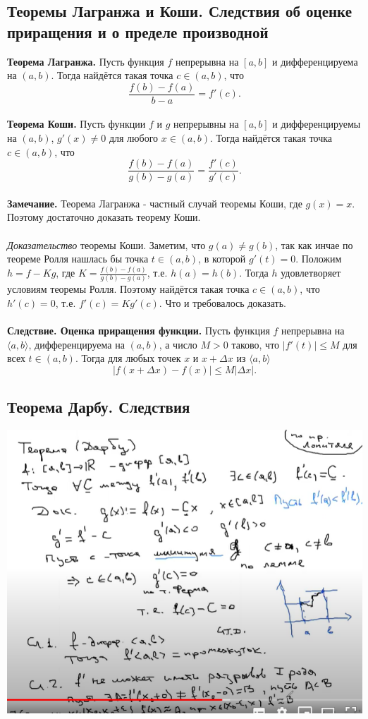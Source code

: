 \newpage
{}
\subsection{Теоремы Лагранжа и Коши. Следствия об оценке приращения и о пределе производной}
\textbf{Теорема Лагранжа.} Пусть функция $f$ непрерывна на $[a, b]$ и дифференцируема на $(a, b)$. Тогда найдётся такая точка $c \in (a, b)$, что $$\frac{f(b)-f(a)}{b-a} = f'(c).$$ \\
\textbf{Теорема Коши.} Пусть функции $f$ и $g$ непрерывны на $[a, b]$ и дифференцируемы на $(a, b)$, $g'(x) \neq 0$ для любого $x \in (a, b)$. Тогда найдётся такая точка $c \in (a, b)$, что $$\frac{f(b)-f(a)}{g(b)-g(a)} = \frac{f'(c)}{g'(c)}.$$ \\
\textbf{Замечание.} Теорема Лагранжа - частный случай теоремы Коши, где $g(x) = x$. Поэтому достаточно доказать теорему Коши. \\ \\
\textit{Доказательство} теоремы Коши. Заметим, что $g(a) \neq g(b)$, так как инчае по теореме Ролля нашлась бы точка $t \in (a, b)$, в которой $g'(t) = 0$. Положим $h = f-Kg$, где $K = \frac{f(b)-f(a)}{g(b)-g(a)}$, т.е. $h(a) = h(b)$. Тогда $h$ удовлетворяет условиям теоремы Ролля. Поэтому найдётся такая точка $c \in (a, b)$, что $h'(c) = 0$, т.е. $f'(c) = Kg'(c)$. 
Что и требовалось доказать.
\\
\\
\textbf{Следствие. Оценка приращения функции.} Пусть функция $f$ непрерывна на 
$\langle a, b \rangle$, дифференцируема на $(a, b)$, а число $M > 0$ таково, что $|f'(t)| \leq M$ для всех $t \in (a, b)$. Тогда для любых точек $x$ и $x+\Delta x$ из $\langle a, b \rangle$ $$|f(x+\Delta x)-f(x)|\leq M|\Delta x|.$$
\newpage
{}
\subsection{Теорема Дарбу. Следствия}

\includegraphics[scale=1.0]{Images/Дарбу.png}

